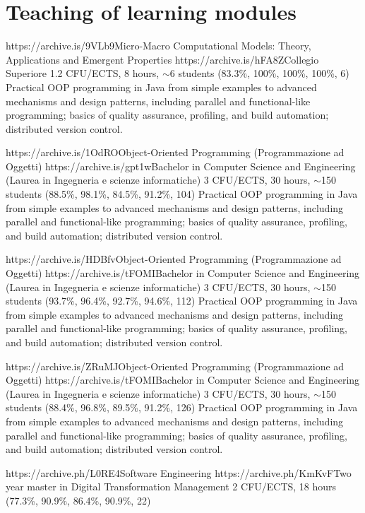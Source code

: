 \section{Teaching of learning modules}
\vspace{-1.9em}
\newcommand{\oopjava}{Practical OOP programming in Java from simple examples to advanced mechanisms and design patterns, including parallel and functional-like programming; basics of quality assurance, profiling, and build automation; distributed version control.}
\newcommand{\sedtmeit}{DevOps: Principles, practices, and tools; agile development and SCRUM; testing; continuous integration and delivery.}
\begin{outerlist}
    \item[2025/26]
        \unibocourse
        {https://archive.is/9VLb9}{Micro-Macro Computational Models: Theory, Applications and Emergent Properties}
        {https://archive.is/hFA8Z}{Collegio Superiore}
        {1.2 CFU/ECTS, 8 hours, $\sim$6 students}
        {(83.3\%, 100\%, 100\%, 100\%, 6)}
        {\oopjava}
    \item[2025/26]
        \unibocourse
        {https://archive.is/1OdRO}{Object-Oriented Programming (Programmazione ad Oggetti)}
        {https://archive.is/gpt1w}{Bachelor in Computer Science and Engineering (Laurea in Ingegneria e scienze informatiche)}
        {3 CFU/ECTS, 30 hours, $\sim$150 students}
        {(88.5\%, 98.1\%, 84.5\%, 91.2\%, 104)}
        {\oopjava}
    \item[2024/25]
        \unibocourse
        {https://archive.is/HDBfv}{Object-Oriented Programming (Programmazione ad Oggetti)}
        {https://archive.is/tFOMI}{Bachelor in Computer Science and Engineering (Laurea in Ingegneria e scienze informatiche)}
        {3 CFU/ECTS, 30 hours, $\sim$150 students}
        {(93.7\%, 96.4\%, 92.7\%, 94.6\%, 112)}
        {\oopjava}
    \item[2023/24]
        \unibocourse
        {https://archive.is/ZRuMJ}{Object-Oriented Programming (Programmazione ad Oggetti)}
        {https://archive.is/tFOMI}{Bachelor in Computer Science and Engineering (Laurea in Ingegneria e scienze informatiche)}
        {3 CFU/ECTS, 30 hours, $\sim$150 students}
        {(88.4\%, 96.8\%, 89.5\%, 91.2\%, 126)}
        {\oopjava}
    \item[2022/23]
        \unibocourse %
        {https://archive.ph/L0RE4}{Software Engineering}
        {https://archive.ph/KmKvF}{Two year master in Digital Transformation Management}
        {2 CFU/ECTS, 18 hours}
        {(77.3\%, 90.9\%, 86.4\%, 90.9\%, 22)}

\end{outerlist}
